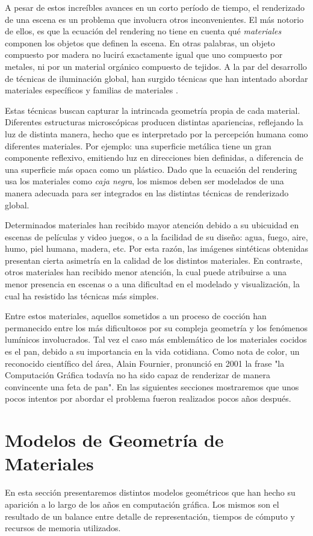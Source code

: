\documentclass[spanish,a4paper,openright,11pt]{book}
\begin{document}
A pesar de estos increíbles avances en un corto período de tiempo, el renderizado de una escena es un problema que involucra otros inconvenientes. El más notorio de ellos, es que la ecuación del rendering no tiene en cuenta qué {\em materiales} componen los objetos que definen la escena. En otras palabras, un objeto compuesto por madera no lucirá exactamente igual que uno compuesto por metales, ni por un material orgánico compuesto de tejidos. A la par del desarrollo de técnicas de iluminación global, han surgido técnicas que han intentado abordar materiales específicos \cite{} y familias de materiales \cite{}.

Estas técnicas buscan capturar la intrincada geometría propia de cada material. Diferentes estructuras microscópicas producen distintas apariencias, reflejando la luz de distinta manera, hecho que es interpretado por la percepción humana como diferentes materiales. Por ejemplo: una superficie metálica tiene un gran componente reflexivo, emitiendo luz en direcciones bien definidas, a diferencia de una superficie más opaca como un plástico. Dado que la ecuación del rendering usa los materiales como {\em caja negra}, los mismos deben ser modelados de una manera adecuada para ser integrados en las distintas técnicas de renderizado global.

Determinados materiales han recibido mayor atención debido a su ubicuidad en escenas de películas y video juegos, o a la facilidad de su diseño: agua, fuego, aire, humo, piel humana, madera, etc. Por esta razón, las imágenes sintéticas obtenidas presentan cierta asimetría en la calidad de los distintos materiales. En contraste, otros materiales han recibido menor atención, la cual puede atribuirse a una menor presencia en escenas o a una dificultad en el modelado y visualización, la cual ha resistido las técnicas más simples.

Entre estos materiales, aquellos sometidos a un proceso de cocción han permanecido entre los más dificultosos por su compleja geometría y los fenómenos lumínicos involucrados. Tal vez el caso más emblemático de los materiales cocidos es el pan, debido a su importancia en la vida cotidiana. Como nota de color, un reconocido  científico del área, Alain Fournier, pronunció en 2001 la frase "la Computación Gráfica todavía no ha sido capaz de renderizar de manera convincente una feta de pan". En las siguientes secciones mostraremos que unos pocos intentos por abordar el problema fueron realizados pocos años después.

\section{Modelos de Geometría de Materiales}
En esta sección presentaremos distintos modelos geométricos que han hecho su aparición a lo largo de los años en computación gráfica. Los mismos son el resultado de un balance entre detalle de representación, tiempos de cómputo y recursos de memoria utilizados.
\end{document}
